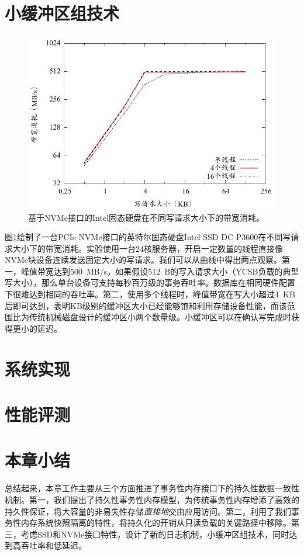 \section{小缓冲区组技术}

\begin{figure}[t]
\centering
\includegraphics[width=0.9\columnwidth]{figures/nvme-bandwidth}
\caption{基于NVMe接口的Intel固态硬盘在不同写请求大小下的带宽消耗。}
\label{fig-nvme-bandwidth}
\end{figure}

图\ref{fig-nvme-bandwidth}绘制了一台PCIe NVMe接口的英特尔固态硬盘Intel SSD DC P3600在不同写请求大小下的带宽消耗。实验使用一台24核服务器，开启一定数量的线程直接像NVMe块设备连续发送固定大小的写请求。我们可以从曲线中得出两点观察。第一，峰值带宽达到500~MB/s，如果假设512~B的写入请求大小（YCSB负载的典型写大小），那么单台设备可支持每秒百万级的事务吞吐率。数据库在相同硬件配置下很难达到相同的吞吐率。第二，使用多个线程时，峰值带宽在写大小超过4~KB后即可达到，表明KB级别的缓冲区大小已经能够饱和利用存储设备性能，而该范围比为传统机械磁盘设计的缓冲区小两个数量级。小缓冲区可以在确认写完成时获得更小的延迟。

\section{系统实现}

\section{性能评测}

\section{本章小结}

总结起来，本章工作主要从三个方面推进了事务性内存接口下的持久性数据一致性机制。第一，我们提出了持久性事务性内存模型，为传统事务性内存增添了高效的持久性保证，将大容量的非易失性存储\emph{直接地}交由应用访问。第二，利用了我们事务性内存系统快照隔离的特性，将持久化的开销从只读负载的关键路径中移除。第三，考虑SSD和NVMe接口特性，设计了新的日志机制，小缓冲区组技术，同时达到高吞吐率和低延迟。


